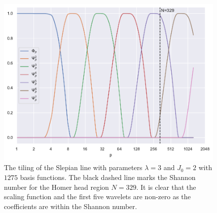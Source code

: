 \begin{figure}[htp]
	\centering
	\includegraphics[width=\textwidth]{homer_slepian_tiling_b1275.pdf}
	\caption{
		The tiling of the Slepian line with parameters \(\lambda=3\) and \(J_{0}=2\) with \(\num{1275}\) basis functions.
		The black dashed line marks the Shannon number for the Homer head region \(N=329\).
		It is clear that the scaling function and the first five wavelets are non-zero as the coefficients are within the Shannon number.
	}\label{fig:chapter4_tiling}
\end{figure}
